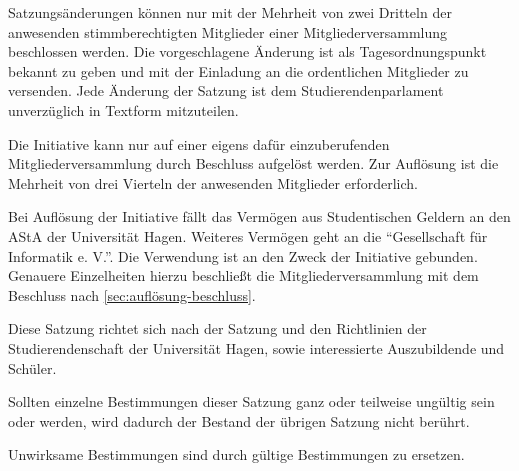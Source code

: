 \begin{contract}
\label{sec:satzungsänderung}

Satzungsänderungen können nur mit der Mehrheit von zwei Dritteln der anwesenden stimmberechtigten Mitglieder einer Mitgliederversammlung beschlossen werden. Die vorgeschlagene Änderung ist als Tagesordnungspunkt bekannt zu geben und mit der Einladung an die ordentlichen Mitglieder zu versenden. Jede Änderung der Satzung ist dem Studierendenparlament unverzüglich in Textform  mitzuteilen.


\label{sec:auflösung}

Die Initiative kann nur auf einer eigens dafür einzuberufenden Mitgliederversammlung durch Beschluss aufgelöst werden. Zur Auflösung ist die Mehrheit von drei Vierteln der anwesenden Mitglieder erforderlich. \label{sec:auflösung-beschluss}

Bei Auflösung der Initiative fällt das Vermögen aus Studentischen Geldern an den AStA der Universität Hagen.  Weiteres Vermögen geht an die ``Gesellschaft für Informatik e. V.''. Die Verwendung ist an den Zweck der Initiative gebunden. Genauere Einzelheiten hierzu beschließt die Mitgliederversammlung mit dem Beschluss nach \ref{sec:auflösung-beschluss}.



Diese Satzung richtet sich nach der Satzung und den Richtlinien der Studierendenschaft der Universität Hagen, sowie interessierte Auszubildende und Schüler.

Sollten einzelne Bestimmungen dieser Satzung ganz oder teilweise ungültig sein oder werden, wird dadurch der Bestand der übrigen Satzung nicht berührt.

Unwirksame Bestimmungen sind durch gültige Bestimmungen zu ersetzen.



\end{contract}
